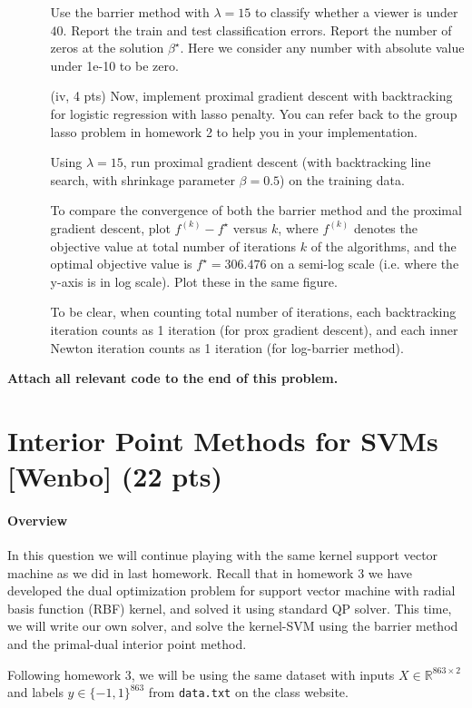 \documentclass{article}
\theoremstyle{remark}
\theoremstyle{definition}
\begin{document}
\begin{enumerate}[(a)]
\begin{enumerate}
	    Use the barrier method with $\lambda=15$ to classify whether a viewer is under $40$. Report the train and test classification errors. Report the number of zeros at the solution $\beta^{\star}$. Here we consider any number with absolute value under 1e-10 to be zero.
	    
	    \item[(iv, 4 pts)] Now, implement proximal gradient descent with backtracking for logistic regression with lasso penalty. You can refer back to the group lasso problem in homework 2 to help you in your implementation.

      Using $\lambda=15$, run proximal gradient descent (with backtracking line search, with shrinkage parameter $\beta=0.5$) on the training data.
	    
	    To compare the convergence of both the barrier method and the proximal gradient descent, plot $f^{(k)} - f^{\star}$ versus $k$,  where $f^{(k)}$ denotes the objective value at total number of iterations $k$ of the algorithms, and the optimal objective value is $f^\star = 306.476$ on a semi-log scale (i.e. where the y-axis is in log scale). Plot these in the same figure. 

      To be clear, when counting total number of iterations, each backtracking iteration counts as 1 iteration (for prox gradient descent), and each inner Newton iteration counts as 1 iteration (for log-barrier method).
	    \end{enumerate}
\end{enumerate}

\textbf{Attach all relevant code to the end of this problem.}
\section{Interior Point Methods for SVMs [Wenbo] (22 pts)}

\paragraph{Overview} In this question we will continue playing with the same kernel support vector machine as we did in last homework. Recall that in homework 3 we have developed the dual optimization problem for support vector machine with radial basis function (RBF) kernel, and solved it using standard QP solver. This time, we will write our own solver, and solve the kernel-SVM using the
barrier method and the primal-dual interior point method.

Following homework 3, we will be using the same dataset with inputs $X \in \mathbb R^{863 \times 2}$ and labels $y \in \{-1, 1\}^{863}$ from \texttt{data.txt} on the class website.
\end{document}

